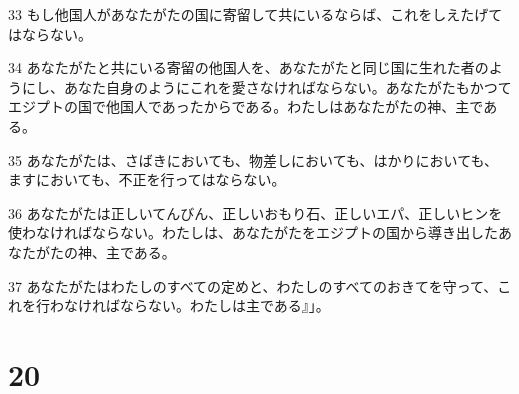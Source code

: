 \par 33 もし他国人があなたがたの国に寄留して共にいるならば、これをしえたげてはならない。
\par 34 あなたがたと共にいる寄留の他国人を、あなたがたと同じ国に生れた者のようにし、あなた自身のようにこれを愛さなければならない。あなたがたもかつてエジプトの国で他国人であったからである。わたしはあなたがたの神、主である。
\par 35 あなたがたは、さばきにおいても、物差しにおいても、はかりにおいても、ますにおいても、不正を行ってはならない。
\par 36 あなたがたは正しいてんびん、正しいおもり石、正しいエパ、正しいヒンを使わなければならない。わたしは、あなたがたをエジプトの国から導き出したあなたがたの神、主である。
\par 37 あなたがたはわたしのすべての定めと、わたしのすべてのおきてを守って、これを行わなければならない。わたしは主である』」。

\chapter{20}


